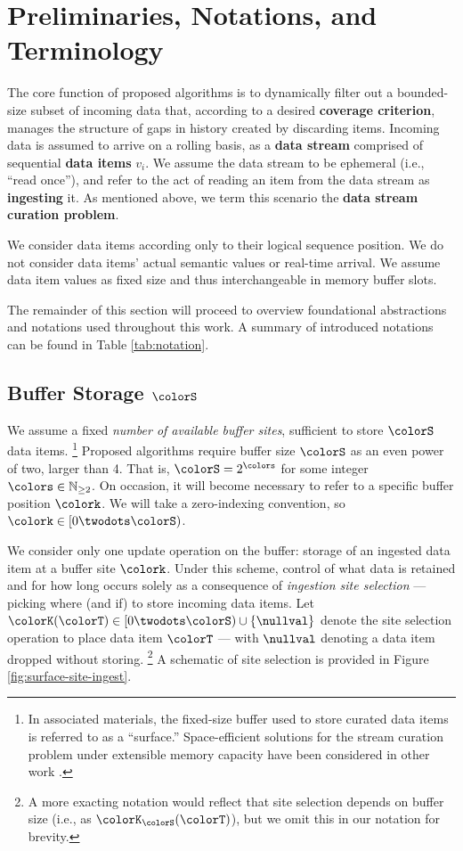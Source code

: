 \section{Preliminaries, Notations, and Terminology} \label{sec:notation}

The core function of proposed algorithms is to dynamically filter out a bounded-size subset of incoming data that, according to a desired \textbf{coverage criterion}, manages the structure of gaps in history created by discarding items.
Incoming data is assumed to arrive on a rolling basis, as a \textbf{data stream} comprised of sequential \textbf{data items} $v_i$.
We assume the data stream to be ephemeral (i.e., ``read once''), and refer to the act of reading an item from the data stream as \textbf{ingesting} it.
As mentioned above, we term this scenario the \textbf{data stream curation problem}.

We consider data items according only to their logical sequence position.
We do not consider data items' actual semantic values or real-time arrival.
We assume data item values as fixed size and thus interchangeable in memory buffer slots.

The remainder of this section will proceed to overview foundational abstractions and notations used throughout this work.
A summary of introduced notations can be found in Table \ref{tab:notation}.



\subsection{Buffer Storage $\colorS$}
\label{sec:notation-buffer}

We assume a fixed \textit{number of available buffer sites}, sufficient to store $\colorS$ data items.%
\footnote{%
In associated materials, the fixed-size buffer used to store curated data items is referred to as a ``surface.''
Space-efficient solutions for the stream curation problem under extensible memory capacity have been considered in other work \citep{moreno2024algorithms}.%
}
Proposed algorithms require buffer size $\colorS$ as an even power of two, larger than 4. That is, $\colorS = 2^{\colors}$ for some integer $\colors \in \mathbb{N}_{\geq 2}$.
On occasion, it will become necessary to refer to a specific buffer position $\colork$.
We will take a zero-indexing convention, so $\colork \in [0\twodots\colorS)$.

We consider only one update operation on the buffer: storage of an ingested data item at a buffer site $\colork$.
Under this scheme, control of what data is retained and for how long occurs solely as a consequence of \textit{ingestion site selection} --- picking where (and if) to store incoming data items.
Let $\colorK(\colorT) \in [0\twodots\colorS)\cup\{\nullval\}$ denote the site selection operation to place data item $\colorT$ --- with $\nullval$ denoting a data item dropped without storing.%
\footnote{%
A more exacting notation would reflect that site selection depends on buffer size (i.e., as $\colorK_{\colorS}(\colorT)$), but we omit this in our notation for brevity.
}
A schematic of site selection is provided in Figure \ref{fig:surface-site-ingest}.

